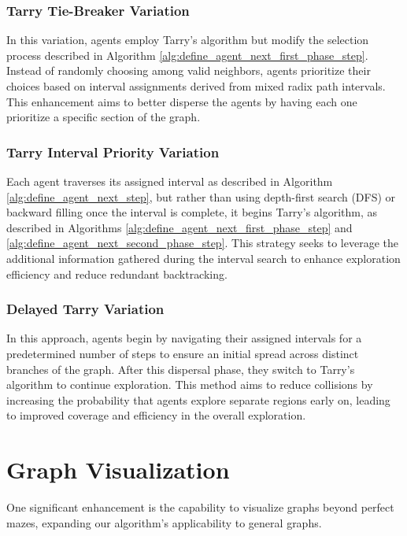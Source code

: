 \subsubsection{Tarry Tie-Breaker Variation}

In this variation, agents employ Tarry's algorithm but modify the selection process described in Algorithm \ref{alg:define_agent_next_first_phase_step}. Instead of randomly choosing among valid neighbors, agents prioritize their choices based on interval assignments derived from mixed radix path intervals. This enhancement aims to better disperse the agents by having each one prioritize a specific section of the graph.

\subsubsection{Tarry Interval Priority Variation}

Each agent traverses its assigned interval as described in Algorithm \ref{alg:define_agent_next_step}, but rather than using depth-first search (DFS) or backward filling once the interval is complete, it begins Tarry's algorithm, as described in Algorithms \ref{alg:define_agent_next_first_phase_step} and \ref{alg:define_agent_next_second_phase_step}. This strategy seeks to leverage the additional information gathered during the interval search to enhance exploration efficiency and reduce redundant backtracking.

\subsubsection{Delayed Tarry Variation}

In this approach, agents begin by navigating their assigned intervals for a predetermined number of steps to ensure an initial spread across distinct branches of the graph. After this dispersal phase, they switch to Tarry's algorithm to continue exploration. This method aims to reduce collisions by increasing the probability that agents explore separate regions early on, leading to improved coverage and efficiency in the overall exploration.

\section{Graph Visualization}
\label{section_method_graph_visualization}

One significant enhancement is the capability to visualize graphs
beyond perfect mazes, expanding our algorithm's applicability to general graphs.

